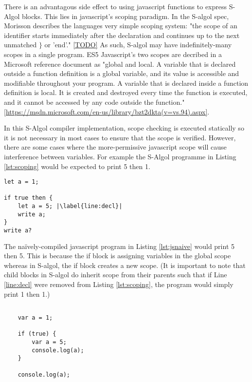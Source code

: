 \documentclass{article}
\begin{document}
There is an advantagous side effect to using javascript functions to express S-Algol blocks. This lies in javascript's scoping paradigm. In the S-algol spec, Morisson describes the languages very simple scoping system: "the scope of an identifier starts immediately after the declaration and continues up to the next unmatched $\}$ or 'end'." \ref{TODO} As such, S-algol may have indefinitely-many scopes in a single program. ES5 Javascript's two scopes are decribed in a Microsoft reference document as "global and local. A variable that is declared outside a function definition is a global variable, and its value is accessible and modifiable throughout your program. A variable that is declared inside a function definition is local. It is created and destroyed every time the function is executed, and it cannot be accessed by any code outside the function." \ref{https://msdn.microsoft.com/en-us/library/bzt2dkta(v=vs.94).aspx}.

In this S-Algol compiler implementation, scope checking is executed statically so it is not necessary in most cases to ensure that the scope is verified. However, there are some cases where the more-permissive javascript scope will cause interference between variables. For example the S-Algol programme in Listing \ref{lst:scoping} would be expected to print 5 then 1.

\begin{lstlisting}[caption={S-Algol scoping},label={lst:scoping}, escapechar="|"]
let a = 1;

if true then {
	let a = 5; |\label{line:decl}|
	write a;
}
write a?
\end{lstlisting}

The naïvely-compiled javascript program in Listing \ref{lst:jsnaive} would print 5 then 5. This is because the if block is assigning variables in the global scope whereas in S-algol, the if block creates a new scope. (It is important to note that child blocks in S-algol do inherit scope from their parents such that if Line \ref{line:decl} were removed from Listing \ref{lst:scoping}, the program would simply print 1 then 1.)

\begin{lstlisting}[caption=Javascript scoping,label=lst:jsnaive]

    var a = 1;
    
    if (true) {
    	var a = 5;
    	console.log(a);
    }
    
    console.log(a);
\end{lstlisting}
\end{document}
